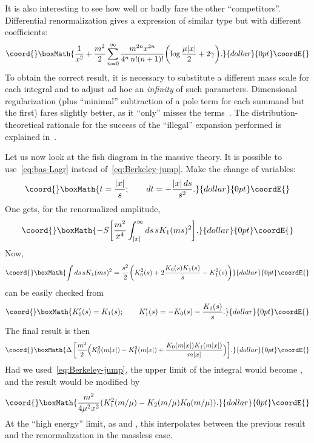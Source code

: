 \documentclass[a4paper,12pt]{article}
\providecommand{\Dl}{\Delta}           %
\providecommand{\ga}{\gamma}           %
\providecommand{\7}{\dagger}           %
\theoremstyle{plain}
\theoremstyle{definition}
\begin{document}
It is also interesting to see how well or badly fare the other
``competitors''. Differential renormalization gives a expression of
similar type but with different coefficients:
$$\coord{}\boxMath{
\frac{1}{x^2} +
\frac{m^2}{2} \sum_{n=0}^\infty \frac{m^{2n}x^{2n}}{4^n\,n!(n+1)!}
\biggl( \log\frac{\mu|x|}{2} + 2\ga \biggr).
}{dollar}{0pt}\coordE{}$$
To obtain the correct result, it is necessary to substitute a
different mass scale \coordHE{} for each integral and to adjust ad hoc an
\textit{infinity} of such parameters. Dimensional regularization (plus
``minimal'' subtraction of a pole term for each summand but the first)
fares slightly better, as it ``only'' misses the \coordHE{}
terms~\cite{NR}. The distribution-theoretical rationale for the
success of the ``illegal'' expansion performed is explained
in~\cite{NR}.

Let us now look at the fish diagram in the massive theory. It is
possible to use~\eqref{eq:bas-Lagr} instead
of~\eqref{eq:Berkeley-jump}. Make the change of variables:
$$\coord{}\boxMath{
t = \frac{|x|}{s};  \qquad  dt = -\frac{|x|\,ds}{s^2}.
}{dollar}{0pt}\coordE{}$$
One gets, for the renormalized amplitude,
$$\coord{}\boxMath{
-S\biggl[ \frac{m^2}{x^4} \int_{|x|}^\infty ds\, s K_1(ms)^2 \biggr].
}{dollar}{0pt}\coordE{}$$
Now,
$$\coord{}\boxMath{
\int ds\, s K_1(ms)^2 = \frac{s^2}{2} \biggl(
K_0^2(s) + 2 \frac{K_0(s)K_1(s)}{s} - K^2_1(s) \biggr)
}{dollar}{0pt}\coordE{}$$
can be easily checked from
$$\coord{}\boxMath{
K'_0(s) = K_1(s);  \qquad  K'_1(s) = - K_0(s) - \frac{K_1(s)}{s}.
}{dollar}{0pt}\coordE{}$$
The final result is then
$$\coord{}\boxMath{
\Dl\,\biggl[ \frac{m^2}{2} \Bigl( K^2_0(m|x|) - K_1^2(m|x|) +
\frac{K_0(m|x|)K_1(m|x|)}{m|x|} \Bigr) \biggr].
}{dollar}{0pt}\coordE{}$$
Had we used~\eqref{eq:Berkeley-jump}, the upper limit of the integral
would become \coordHE{}, and the result would be modified by
$$\coord{}\boxMath{
\frac{m^2}{4\mu^2x^2} (K^2_1(m/\mu) - K_2(m/\mu)K_0(m/\mu)).
}{dollar}{0pt}\coordE{}$$
At the ``high energy'' limit, as \myHighlight{$\mu \uparrow \infty$}\coordHE{} and
\coordHE{}, this interpolates between the previous result and
the renormalization in the massless case.
\end{document}

